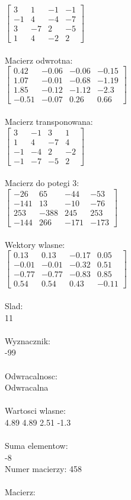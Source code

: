 \documentclass[a4paper,12pt]{article}
\begin{document}
$\begin{bmatrix} 3&1&-1&-1\\-1&4&-4&-7\\3&-7&2&-5\\1&4&-2&2 \end{bmatrix}$
\\
\\
Macierz odwrotna:\\

$\begin{bmatrix} 0.42&-0.06&-0.06&-0.15\\1.07&-0.01&-0.68&-1.19\\1.85&-0.12&-1.12&-2.3\\-0.51&-0.07&0.26&0.66 \end{bmatrix}$
\\
\\
Macierz transponowana:\\

$\begin{bmatrix} 3&-1&3&1\\1&4&-7&4\\-1&-4&2&-2\\-1&-7&-5&2 \end{bmatrix}$
\\
\\
Macierz do potegi 3:\\

$\begin{bmatrix} -26&65&-44&-53\\-141&13&-10&-76\\253&-388&245&253\\-144&266&-171&-173 \end{bmatrix}$
\\
\\
Wektory wlasne:\\

$\begin{bmatrix} 0.13&0.13&-0.17&0.05\\-0.01&-0.01&-0.32&0.51\\-0.77&-0.77&-0.83&0.85\\0.54&0.54&0.43&-0.11 \end{bmatrix}$
\\
\\
Slad:\\
11
\\
\\
Wyznacznik:\\
-99
\\
\\
Odwracalnosc:\\
Odwracalna
\\
\\
Wartosci wlasne:\\
4.89 4.89 2.51 -1.3
\\
\\
Suma elementow:\\
-8
\\
\newpage
Numer macierzy:
458
\\
\\
Macierz:\\
\end{document}
